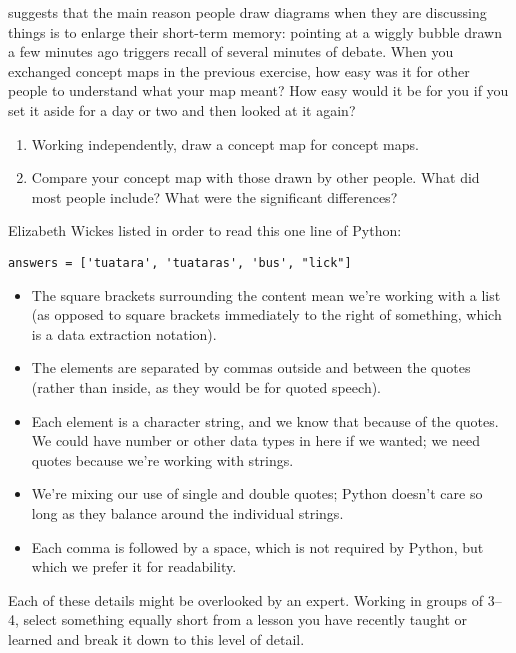 
\cite{Cher2007} suggests that
the main reason people draw diagrams when they are discussing things
is to enlarge their short-term memory:
pointing at a wiggly bubble drawn a few minutes ago triggers recall of several minutes of debate.
When you exchanged concept maps in the previous exercise,
how easy was it for other people to understand what your map meant?
How easy would it be for you if you set it aside for a day or two and then looked at it again?


\begin{enumerate}

\item
  Working independently,
  draw a concept map for concept maps.

\item
  Compare your concept map with those drawn by other people.
  What did most people include?
  What were the significant differences?

\end{enumerate}


Elizabeth Wickes listed
in order to read this one line of Python:

\begin{verbatim}
answers = ['tuatara', 'tuataras', 'bus', "lick"]
\end{verbatim}

\begin{itemize}
\item
  The square brackets surrounding the content mean we're working with a list
  (as opposed to square brackets immediately to the right of something,
  which is a data extraction notation).
\item
  The elements are separated by commas outside and between the quotes
  (rather than inside, as they would be for quoted speech).
\item
  Each element is a character string,
  and we know that because of the quotes.
  We could have number or other data types in here if we wanted;
  we need quotes because we're working with strings.
\item
  We're mixing our use of single and double quotes;
  Python doesn't care so long as they balance around the individual strings.
\item
  Each comma is followed by a space,
  which is not required by Python,
  but which we prefer it for readability.
\end{itemize}

Each of these details might be overlooked by an expert.
Working in groups of 3--4,
select something equally short from a lesson you have recently taught or learned
and break it down to this level of detail.
